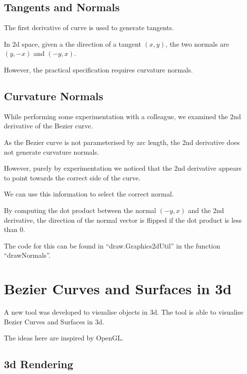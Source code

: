 \documentclass{article}
\begin{document}
\subsection{Tangents and Normals}

The first derivative of curve is used to generate tangents. 

In 2d space, given a the direction of a tangent $(x, y)$, the two normals are $(y, -x)$ and $(-y, x)$.  

However, the practical specification requires curvature normals.

\subsection{Curvature Normals}

While performing some experimentation with a colleague, we examined the 2nd derivative of the Bezier curve.

As the Bezier curve is not parameterised by arc length, the 2nd derivative does not generate curvature normals.

However, purely by experimentation we noticed that the 2nd derivative appears to point towards the correct side of the curve.

We can use this information to select the correct normal. 

By computing the dot product between the normal $(-y, x)$ and the 2nd derivative, the direction of the normal vector is flipped if the dot product is less than 0.

The code for this can be found in ``draw.Graphics2dUtil'' in the function ``drawNormals''.








\section{Bezier Curves and Surfaces in 3d}

A new tool was developed to visualise objects in 3d. The tool is able to visualise Bezier Curves and Surfaces in 3d.

The ideas here are inspired by OpenGL.

\subsection{3d Rendering}
\end{document}
